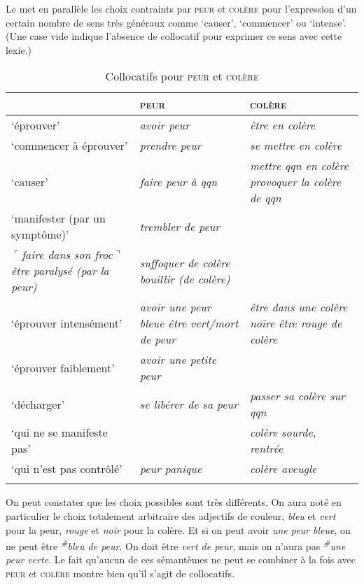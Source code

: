 Le  met en parallèle les choix contraints par \textsc{peur} et \textsc{colère} pour l’expression d’un certain nombre de sens très généraux comme ‘causer’, ‘commencer’ ou ‘intense’. (Une case vide indique l’absence de collocatif pour exprimer ce sens avec cette lexie.)

\begin{table}
\caption{Collocatifs pour \textsc{peur} et \textsc{colère}\label{tab:2-3:1}}
\begin{tabularx}{\textwidth}{QQQ}
\lsptoprule
 & {\scshape peur} & {\scshape colère}\\
 \midrule
‘éprouver’ & {\itshape avoir peur} & {\itshape être en colère}\\
‘commencer à éprouver’ & {\itshape prendre peur} & {\itshape se mettre en colère}\\
‘causer’ & {\itshape faire peur à qqn} & {\itshape mettre qqn en colère} {\itshape provoquer la colère de qqn}\\
‘manifester (par un symptôme)’ & \textit{trembler de peur}\\
$⌜$\textit{faire dans son froc}$⌝$ {\itshape être paralysé (par la peur)} & {\itshape suffoquer de colère bouillir (de colère)}\\
‘éprouver intensément’ & {\itshape avoir une peur bleue être vert/mort de peur} & {\itshape être dans une colère noire être rouge de colère}\\
‘éprouver faiblement’ & {\itshape avoir une petite peur} & \\
‘décharger’ & {\itshape se libérer de sa peur} & {\itshape passer sa colère sur qqn}\\
‘qui ne se manifeste pas’ &  & {\itshape colère sourde, rentrée}\\
‘qui n’est pas contrôlé’ & {\itshape peur panique} & {\itshape colère aveugle}\\
\lspbottomrule
\end{tabularx}
\end{table}

On peut constater que les choix possibles sont très différents. On aura noté en particulier le choix totalement arbitraire des adjectifs de couleur, \textit{bleu} et \textit{vert} pour la peur, \textit{rouge} et \textit{noir} pour la colère. Et si on peut avoir \textit{une peur bleue}, on ne peut être \textit{\textsuperscript{\#}}\textit{bleu de peur}. On doit être \textit{vert de peur}, mais on n’aura pas \textit{\textsuperscript{\#}}\textit{une peur verte}. Le fait qu’aucun de ces sémantèmes ne peut se combiner à la fois avec \textsc{peur} et \textsc{colère} montre bien qu’il s’agit de collocatifs.

